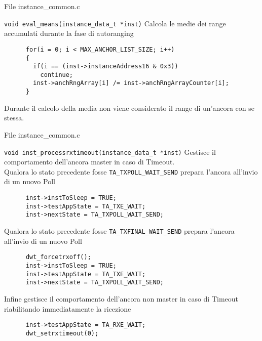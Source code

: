 \begin{frame}[fragile]{File instance\_common.c}
  \begin{block}{\lstinline!void eval_means(instance_data_t *inst)!}
    Calcola le medie dei range accumulati durante la fase di autoranging
    \begin{lstlisting}
      for(i = 0; i < MAX_ANCHOR_LIST_SIZE; i++)
      {
        if(i == (inst->instanceAddress16 & 0x3))
          continue;
        inst->anchRngArray[i] /= inst->anchRngArrayCounter[i];
      }
    \end{lstlisting}
    Durante il calcolo della media \alert{non} viene considerato il range di un'ancora con se stessa.
  \end{block}
\end{frame}

\begin{frame}[fragile,shrink=30]{File instance\_common.c}
  \begin{block}{\lstinline!void inst_processrxtimeout(instance_data_t *inst)!}
    Gestisce il comportamento dell'ancora master in caso di Timeout.\\
    Qualora lo stato precedente fosse \lstinline!TA_TXPOLL_WAIT_SEND! prepara l'ancora all'invio di un nuovo Poll
    \begin{lstlisting}
      inst->instToSleep = TRUE;
      inst->testAppState = TA_TXE_WAIT;
      inst->nextState = TA_TXPOLL_WAIT_SEND;
    \end{lstlisting}
    Qualora lo stato precedente fosse \lstinline!TA_TXFINAL_WAIT_SEND! prepara l'ancora all'invio di un nuovo Poll    
    \begin{lstlisting}
      dwt_forcetrxoff();
      inst->instToSleep = TRUE;
      inst->testAppState = TA_TXE_WAIT;
      inst->nextState = TA_TXPOLL_WAIT_SEND;
    \end{lstlisting}
    Infine gestisce il comportamento dell'ancora \alert{non} master in caso di Timeout riabilitando immediatamente la ricezione
    \begin{lstlisting}
      inst->testAppState = TA_RXE_WAIT;
      dwt_setrxtimeout(0);
    \end{lstlisting}
  \end{block}
\end{frame}

